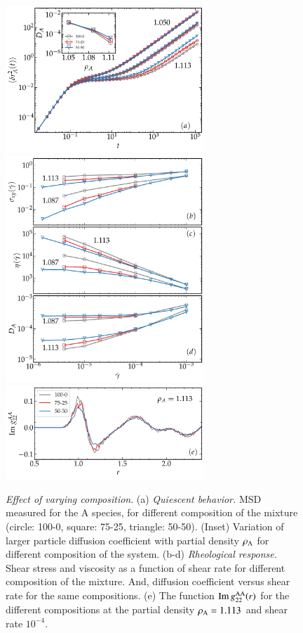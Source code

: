 %
\begin{figure}[htb!]
\centering
\includegraphics[width=7.5cm]{figs/fig7p8a.pdf}
\includegraphics[width=7.5cm]{figs/fig7p8bd.pdf}
\includegraphics[width=7.5cm]{figs/fig7p8e.pdf}
\caption[{\em Effect of varying composition in quiescent and sheared samples}]{{\em Effect of varying composition}. (a) {\em  Quiescent behavior.} MSD measured for the A species, for different composition of the mixture (circle: 100-0, square: 75-25, triangle: 50-50). (Inset) Variation of larger particle diffusion coefficient with partial density $\rho_{\rm A}$ for different composition of the system. (b-d) {\em Rheological response.} Shear stress and viscosity as a function of shear rate for different composition of the mixture. And, diffusion coefficient versus shear rate for the same compositions. (e) The function ${\rm Im} \, g_{22}^{\rm AA}(r)$ for the different compositions at the partial density $\rho_{\rm A}= 1.113$ and shear rate $10^{-4}$.} \label{fig8}
\end{figure}
%

